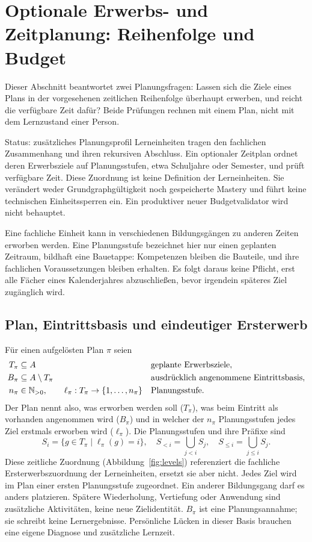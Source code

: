 \section{Optionale Erwerbs- und Zeitplanung: Reihenfolge und Budget}
\label{sec:levels}
Dieser Abschnitt beantwortet zwei Planungsfragen: Lassen sich die Ziele
eines Plans in der vorgesehenen zeitlichen Reihenfolge überhaupt erwerben,
und reicht die verfügbare Zeit dafür? Beide Prüfungen rechnen mit einem
Plan, nicht mit dem Lernzustand einer Person.

\begin{principle}{Status: zusätzliches Planungsprofil}
Lerneinheiten tragen den fachlichen Zusammenhang und ihren rekursiven
Abschluss. Ein optionaler Zeitplan ordnet deren Erwerbsziele auf
Planungsstufen, etwa Schuljahre oder Semester, und prüft verfügbare Zeit.
Diese Zuordnung ist keine Definition der Lerneinheiten. Sie verändert weder
Grundgraphgültigkeit noch gespeicherte Mastery und führt keine technischen
Einheitssperren ein. Ein produktiver neuer Budgetvalidator wird nicht behauptet.
\end{principle}

Eine fachliche Einheit kann in verschiedenen Bildungsgängen zu anderen
Zeiten erworben werden. Eine Planungsstufe bezeichnet hier nur einen
geplanten Zeitraum, bildhaft eine Bauetappe: Kompetenzen bleiben die
Bauteile, und ihre fachlichen Voraussetzungen bleiben erhalten. Es folgt
daraus keine Pflicht, erst alle Fächer eines Kalenderjahres abzuschließen,
bevor irgendein späteres Ziel zugänglich wird.

\subsection{Plan, Eintrittsbasis und eindeutiger Ersterwerb}
Für einen aufgelösten Plan $\pi$ seien
\begin{align}
 T_\pi&\subseteq A &&\text{geplante Erwerbsziele},\\
 B_\pi&\subseteq A\setminus T_\pi &&\text{ausdrücklich angenommene Eintrittsbasis},\\
 n_\pi&\in\mathbb{N}_{>0},\qquad
 \ell_\pi:T_\pi\to\{1,\ldots,n_\pi\} &&\text{Planungsstufe}.
\end{align}
Der Plan nennt also, was erworben werden soll ($T_\pi$), was beim Eintritt
als vorhanden angenommen wird ($B_\pi$) und in welcher der $n_\pi$
Planungsstufen jedes Ziel erstmals erworben wird ($\ell_\pi$).
Die Planungsstufen und ihre Präfixe sind
\[
 S_i=\{g\in T_\pi\mid\ell_\pi(g)=i\},\quad
 S_{<i}=\bigcup_{j<i}S_j,\quad S_{\leq i}=\bigcup_{j\leq i}S_j.
\]
Diese zeitliche Zuordnung (Abbildung~\ref{fig:levels}) referenziert die
fachliche Ersterwerbszuordnung der Lerneinheiten, ersetzt sie aber nicht. Jedes Ziel wird im Plan
einer ersten Planungsstufe zugeordnet. Ein anderer
Bildungsgang darf es anders platzieren. Spätere Wiederholung, Vertiefung oder
Anwendung sind zusätzliche Aktivitäten, keine neue Zielidentität.
$B_\pi$ ist eine Planungsannahme; sie schreibt keine Lernergebnisse.
Persönliche Lücken in dieser Basis brauchen eine eigene Diagnose und
zusätzliche Lernzeit.

